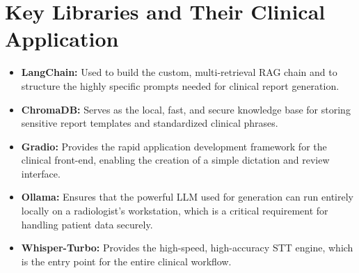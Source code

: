 \section{Key Libraries and Their Clinical Application}
\begin{itemize}
    \item \textbf{LangChain:} Used to build the custom, multi-retrieval RAG chain and to structure the highly specific prompts needed for clinical report generation.
    \item \textbf{ChromaDB:} Serves as the local, fast, and secure knowledge base for storing sensitive report templates and standardized clinical phrases.
    \item \textbf{Gradio:} Provides the rapid application development framework for the clinical front-end, enabling the creation of a simple dictation and review interface.
    \item \textbf{Ollama:} Ensures that the powerful LLM used for generation can run entirely locally on a radiologist's workstation, which is a critical requirement for handling patient data securely.
    \item \textbf{Whisper-Turbo:} Provides the high-speed, high-accuracy STT engine, which is the entry point for the entire clinical workflow.
\end{itemize}
